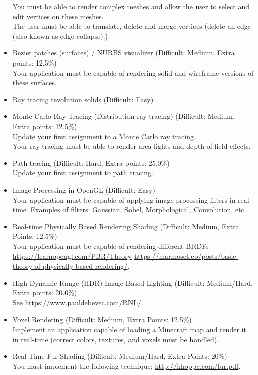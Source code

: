 \documentclass[11pt]{article}
\begin{document}
\begin{itemize}
You must be able to render complex meshes and allow the user to select and edit vertices on these meshes.\\
The user must be able to translate, delete and merge vertices (delete an edge (also known as edge collapse).)
\item Bezier patches (surfaces) / NURBS visualizer (Difficult: Medium, Extra points: 12.5\%)\\
Your application must be capable of rendering solid and wireframe versions of these surfaces.
\item Ray tracing revolution solids (Difficult: Easy)\\
\item Monte Carlo Ray Tracing (Distribution ray tracing) (Difficult: Medium, Extra points: 12.5\%)\\
Update your first assignment to a Monte Carlo ray tracing. \\
Your ray tracing must be able to render area lights and depth of field effects.
\item Path tracing (Difficult: Hard, Extra points: 25.0\%)\\
Update your first assignment to path tracing.
\item Image Processing in OpenGL (Difficult: Easy)\\
Your application must be capable of applying image processing filters in real-time. Examples of filters: Gaussian, Sobel, Morphological, Convolution, etc.\\
\item Real-time Physically Based Rendering Shading (Difficult: Medium, Extra Points: 12.5\%)\\
Your application must be capable of rendering different BRDFs
\url{https://learnopengl.com/PBR/Theory}
\url{https://marmoset.co/posts/basic-theory-of-physically-based-rendering/}.
\item High Dynamic Range (HDR) Image-Based Lighting (Difficult: Medium/Hard, Extra points: 20.0\%)\\
See \url{https://www.pauldebevec.com/RNL/}.
\item Voxel Rendering (Difficult: Medium, Extra Points: 12.5\%)\\
Implement an application capable of loading a Minecraft map and render it in real-time (correct colors, textures, and voxels must be handled).  
\item Real-Time Fur Shading (Difficult: Medium/Hard, Extra Points: 20\%)\\
You must implement the following technique: \url{http://hhoppe.com/fur.pdf}.

\end{itemize}
\end{document}
